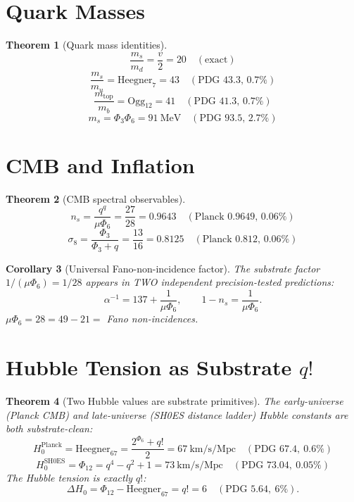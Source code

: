 \documentclass[11pt]{article}
\newtheorem{theorem}{Theorem}
\newtheorem{corollary}[theorem]{Corollary}
\begin{document}
\section{Quark Masses}\label{sec:quarks}

\begin{theorem}[Quark mass identities]\label{thm:quarks}
\[
  \frac{m_s}{m_d} = \frac{v}{2} = 20 \quad (\text{exact})
\]
\[
  \frac{m_s}{m_u} = \mathrm{Heegner}_7 = 43 \quad (\text{PDG 43.3, 0.7\%})
\]
\[
  \frac{m_{\mathrm{top}}}{m_b} = \mathrm{Ogg}_{12} = 41 \quad (\text{PDG 41.3, 0.7\%})
\]
\[
  m_s = \Phi_3 \Phi_6 = 91~\mathrm{MeV} \quad (\text{PDG 93.5, 2.7\%})
\]
\end{theorem}

\section{CMB and Inflation}\label{sec:cmb}

\begin{theorem}[CMB spectral observables]\label{thm:cmb}
\[
  n_s = \frac{q^q}{\mu \Phi_6} = \frac{27}{28} = 0.9643 \quad (\text{Planck 0.9649, 0.06\%})
\]
\[
  \sigma_8 = \frac{\Phi_3}{\Phi_3 + q} = \frac{13}{16} = 0.8125 \quad (\text{Planck 0.812, 0.06\%})
\]
\end{theorem}

\begin{corollary}[Universal Fano-non-incidence factor]\label{cor:fano_28}
The substrate factor $1/(\mu \Phi_6) = 1/28$ appears in TWO independent
precision-tested predictions:
\[
  \alpha^{-1} = 137 + \frac{1}{\mu \Phi_6}, \qquad
  1 - n_s = \frac{1}{\mu \Phi_6}.
\]
$\mu\Phi_6 = 28 = 49 - 21 = $ Fano non-incidences.
\end{corollary}

\section{Hubble Tension as Substrate $q!$}\label{sec:hubble}

\begin{theorem}[Two Hubble values are substrate primitives]\label{thm:hubble}
The early-universe (Planck CMB) and late-universe (SH0ES distance
ladder) Hubble constants are both substrate-clean:
\[
  H_0^{\mathrm{Planck}} = \mathrm{Heegner}_{67} = \frac{2^{\Phi_6}+q!}{2} = 67~\mathrm{km/s/Mpc} \quad (\text{PDG } 67.4,\ 0.6\%)
\]
\[
  H_0^{\mathrm{SH0ES}}  = \Phi_{12} = q^4 - q^2 + 1 = 73~\mathrm{km/s/Mpc} \quad (\text{PDG } 73.04,\ 0.05\%)
\]
The Hubble tension is exactly $q!$:
\[
  \Delta H_0 = \Phi_{12} - \mathrm{Heegner}_{67} = q! = 6 \quad (\text{PDG } 5.64,\ 6\%).
\]
\end{theorem}
\end{document}
